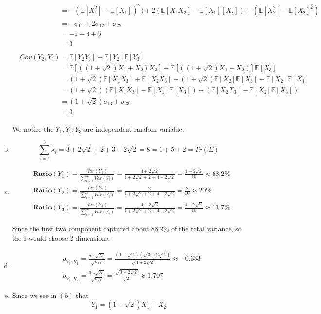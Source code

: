 \documentclass[11pt]{article}
\begin{document}
\begin{enumerate}[(a)]
\begin{align}
			&\phantom{Cov(Y_1, Y_3)} = -(\mathbb{E}[X^2_1] - \mathbb{E}[X_1])^2) + 2(\mathbb{E}[X_1X_2] - \mathbb{E}[X_1][X_2]) + (\mathbb{E}[X_2^2] - \mathbb{E}[X_2]^2)\nonumber\\
			&\phantom{Cov(Y_1, Y_3)} = -\sigma_{11} + 2\sigma_{12} + \sigma_{22}\nonumber\\
			&\phantom{Cov(Y_1, Y_3)} = -1 - 4 + 5\nonumber\\
			&\phantom{Cov(Y_1, Y_3)} = 0\nonumber\\
			&\nonumber\\
			&Cov(Y_2, Y_3) = \mathbb{E}[Y_2Y_3] - \mathbb{E}[Y_2]\mathbb{E}[Y_3]\nonumber\\
			&\phantom{Cov(Y_2, Y_3)} = \mathbb{E}[((1 + \sqrt{2})X_1 + X_2)X_3] - \mathbb{E}[((1 + \sqrt{2})X_1 + X_2)]\mathbb{E}[X_3]\nonumber\\
			&\phantom{Cov(Y_2, Y_3)} = (1 + \sqrt{2})\mathbb{E}[X_1X_3] + \mathbb{E}[X_2X_3] - (1 + \sqrt{2})\mathbb{E}[X_2]\mathbb{E}[X_3] - \mathbb{E}[X_2]\mathbb{E}[X_3]\nonumber\\
			&\phantom{Cov(Y_2, Y_3)} = (1 + \sqrt{2})(\mathbb{E}[X_1X_3] - \mathbb{E}[X_1]\mathbb{E}[X_3]) + (\mathbb{E}[X_2X_3] - \mathbb{E}[X_2]\mathbb{E}[X_3])\nonumber\\
			&\phantom{Cov(Y_2, Y_3)} = (1 + \sqrt{2})\sigma_{13} + \sigma_{23}\nonumber\\
			&\phantom{Cov(Y_2, Y_3)} = 0\nonumber
		\end{align}
		
		We notice the $Y_1, Y_2, Y_3$ are independent random variable.
		\item
		\[\sum_{i = 1}^3 \lambda_i = 3 + 2\sqrt{2} + 2 + 3 - 2\sqrt{2} = 8 =  1 + 5 + 2 = Tr(\Sigma)\]
		\item
		\begin{align}
			&\textbf{Ratio}(Y_1) = \frac{Var(Y_1)}{\sum_{i = 1}^3 Var(Y_i)} = \frac{4 + 2\sqrt{2}}{4 + 2\sqrt{2} + 2 + 4 - 2\sqrt{2}} = \frac{4 + 2\sqrt{2}}{10} \approx 68.2\% \nonumber\\
			&\textbf{Ratio}(Y_2) = \frac{Var(Y_2)}{\sum_{i = 1}^3 Var(Y_i)} = \frac{2}{4 + 2\sqrt{2} + 2 + 4 - 2\sqrt{2}} = \frac{2}{10} \approx 20\% \nonumber\\
			&\textbf{Ratio}(Y_3) = \frac{Var(Y_3)}{\sum_{i = 1}^3 Var(Y_i)} = \frac{4 - 2\sqrt{2}}{4 + 2\sqrt{2} + 2 + 4 - 2\sqrt{2}} = \frac{4 - 2\sqrt{2}}{10} \approx 11.7\% \nonumber
		\end{align}
		
		Since the first two component captured about 88.2\% of the total variance, so the I would choose $2$ dimensions.
		\item
		\begin{align}
			&\rho_{Y_1,X_1} = \frac{u_{11} \sqrt{\lambda_1}}{\sqrt{\sigma_{11}}} = \frac{(1 - \sqrt{2})(\sqrt{3 + 2\sqrt{2}})}{\sqrt{4 + 2\sqrt{2}}} \approx -0.383\nonumber\\
			&\rho_{Y_1,X_2} = \frac{u_{12} \sqrt{\lambda_1}}{\sqrt{\sigma_{22}}} = \frac{\sqrt{3 + 2\sqrt{2}}}{\sqrt{2}} \approx 1.707\nonumber
		\end{align}
		\item Since we see in $(b)$ that
		\[Y_1 = (1 - \sqrt{2})X_1 + X_2\]
		

\end{enumerate}
\end{document}

